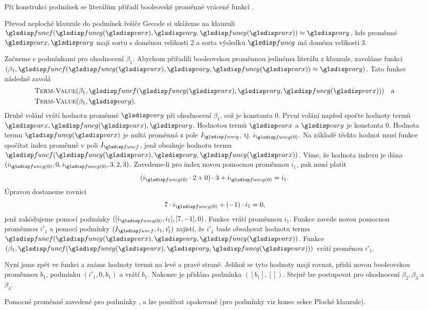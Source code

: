 {Při konstrukci podmínek \Clause{} se literálům přiřadí
booleovské proměnné vrácené funkcí \VarForAtom.

Převod neploché klauzule do podmínek řešiče Gecode si ukážeme na
klauzuli $\func(\funcG(\var), \varY, \funcG(\var)) \approx \varY$,
kde proměnné $\var, \varY$ mají sortu s doménou velikosti 2 a
sorta výsledku $\funcG$ má doménu velikosti 3.

Začneme s podmínkami pro ohodnocení $\beta_1$. Abychom
přiřadili booleovskou proměnnou jedinému literálu
z klauzule, zavoláme funkci \VarForAtom$(\beta_1, \allowbreak
\func(\funcG(\var), \varY, \funcG(\var)) \approx \varY)$.
Tato funkce následně zavolá
\begin{align*}
&\TermValue(\beta_1, \func(\funcG(\var), \varY, \funcG(\var))) \quad\text{a} \\
&\TermValue(\beta_1, \varY).
\end{align*}
Druhé volání vrátí hodnotu proměnné $\varY$ při ohodnocení $\beta_1$,
což je konstanta 0. První volání napřed spočte hodnoty
termů $\var, \funcG(\var), \varY$. Hodnotou termů $\var$ a $\varY$
je konstanta 0. Hodnota termu $\funcG(\var)$ je nultá proměnná
z pole $I_\funcG$, tj. $i_{\funcG(0)}$.
Na základě těchto hodnot musí funkce \Index{} spočítat
index proměnné v poli $I_\func$, jenž obsahuje hodnotu termu
$\func(\funcG(\var), \varY, \funcG(\var))$. Víme,
že hodnota indexu je dána
\Horner$(i_{\funcG(0)}, 0, i_{\funcG(0)}, 3, 2, 3)$.
Zavedeme-li pro index novou pomocnou proměnnou $i_1$, pak musí platit
\[
  (i_{\funcG(0)} \cdot 2 + 0) \cdot 3 + i_{\funcG(0)} = i_1.
\]
Úpravou dostaneme rovnici
\[
  7 \cdot i_{\funcG(0)} + (-1) \cdot i_1 = 0,
\]
jenž zakódujeme pomocí podmínky \Linear$([i_{\funcG(0)}, i_1], [7, -1], 0)$.
Funkce \Index{} vrátí proměnnou $i_1$. Funkce \TermValue{}
zavede novou pomocnou proměnnou $i'_1$ a pomocí podmínky
\Element$(I_\func, i_1, i'_1)$ zajistí, že $i'_1$ bude obsahovat hodnotu termu
$\func(\funcG(\var), \varY, \funcG(\var))$. Funkce
\TermValue$(\beta_1, \func(\funcG(\var), \varY, \funcG(\var)))$
vrátí proměnou $i'_1$.

Nyní jsme zpět ve funkci \VarForAtom{} a známe hodnoty
termů na levé a pravé straně. Jelikož se tyto hodnoty
mají rovnat, přidá \VarForAtom{} novou booleovskou proměnnou $b_1$,
podmínku \Eq$(i'_1, 0, b_1)$ a vrátí $b_1$.
Nakonec je přidána podmínka \Clause$([b_1], [])$.
Stejně lze postupovat pro ohodnocení $\beta_2, \beta_3$ a $\beta_4$.

Pomocné proměnné zavedené pro podmínky \Linear{}, \Element{} a \Eq{}
lze používat opakovaně (pro podmínky \Eq{} viz konec sekce
Ploché klauzule).

}

